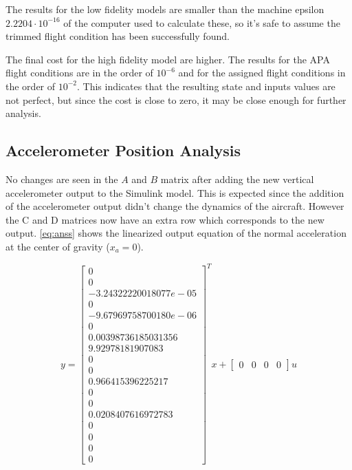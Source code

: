 The results for the low fidelity models are smaller than the machine epsilon $2.2204\cdot10^{-16}$ of the computer used to calculate these, so it's safe to assume the trimmed flight condition has been successfully found. 

The final cost for the high fidelity model are higher. The results for the APA flight conditions are in the order of $10^{-6}$ and for the assigned flight conditions in the order of $10^{-2}$. This indicates that the resulting state and inputs values are not perfect, but since the cost is close to zero, it may be close enough for further analysis.


\subsection{Accelerometer Position Analysis}
No changes are seen in the $A$ and $B$ matrix after adding the new vertical accelerometer output to the Simulink model. This is expected since the addition of the accelerometer output didn't change the dynamics of the aircraft. However the C and D matrices now have an extra row which corresponds to the new output. \autoref{eq:anss} shows the linearized output equation of the normal acceleration at the center of gravity ($x_a=0$).

\begin{equation}
    \label{eq:anss}
    y = \begin{bmatrix}
        0 \\ 0 \\ -3.24322220018077e-05 \\ 0 \\ -9.67969758700180e-06 \\ 0 \\ 
        0.00398736185031356 \\ 9.92978181907083 \\ 0 \\ 0 \\ 0.966415396225217 \\ 
        0 \\ 0 \\ 0.0208407616972783 \\ 0 \\ 0 \\ 0 \\ 0
        \end{bmatrix}^T x + 
        \begin{bmatrix}
        0 & 0 & 0 & 0
    \end{bmatrix} u
\end{equation}

